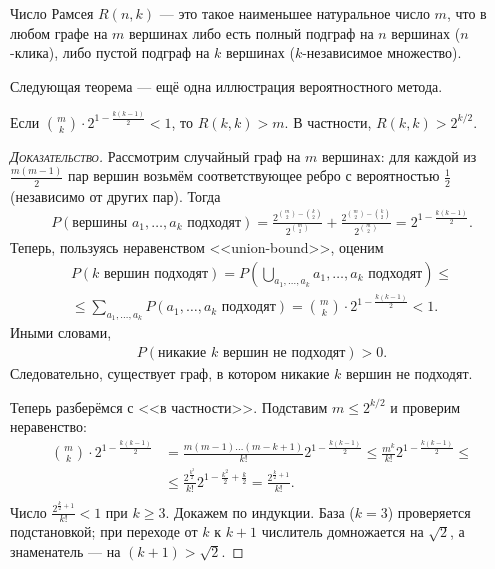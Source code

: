 \documentclass[../main.tex]{subfiles}
\begin{document}
\begin{exmpl*}
 Число Рамсея $R(n,k)$  --- это такое наименьшее натуральное число $m$, что в любом графе на $m$ вершинах либо есть полный подграф на $n$ вершинах ($n$-клика), либо пустой подграф на $k$ вершинах ($k$-независимое множество).
\end{exmpl*}
Следующая теорема --- ещё одна иллюстрация вероятностного метода.
\begin{thm}[Эрдёша]
 Если $\binom m k \cdot 2^{1 - \frac{k(k-1)}{2}} < 1$, то $R(k,k) > m$. В частности, $R(k,k) > 2^{k / 2}$.
\end{thm}
\begin{proof}[\normalfont\textsc{Доказательство}]
 Рассмотрим случайный граф на $m$  вершинах: для каждой из $\frac{m(m-1)}{2}$ пар вершин возьмём соответствующее ребро с вероятностью $\frac{1}{2}$ (независимо от других пар). Тогда
 \begin{align*}
  P(\text{вершины }a_1, \ldots, a_k\text{ подходят}) =  \frac{2^{\binom m 2 - \binom k 2}}{2^{\binom m 2}} + \frac{2^{\binom m 2 - \binom k 2}}{2^{\binom m 2}} =  2^{1-\frac{k(k-1)}{2}}.
 \end{align*} Теперь, пользуясь неравенством <<union-bound>>, оценим
 \begin{align*}
  P(k \text{ вершин подходят}) = P \left( \bigcup_{a_1, \ldots, a_k} a_1, \ldots, a_k \text{ подходят} \right) \leqslant \\
  \leqslant \sum_{a_1, \ldots, a_k}  P(a_1, \ldots, a_k \text{ подходят}) = \binom m k \cdot 2^{1 - \frac{k(k-1)}{2}} < 1.
 \end{align*} Иными словами,
 \begin{align*}
  P(\text{никакие $k$ вершин не подходят}) > 0.
 \end{align*} Следовательно, существует граф, в котором никакие  $k$  вершин не подходят.

 Теперь разберёмся с <<в частности>>. Подставим $m \leqslant 2^{k / 2}$ и проверим неравенство:
 \begin{align*}
  \binom m k \cdot 2^{1 - \frac{k(k-1)}{2}} &= \frac{m (m-1) \ldots (m - k + 1)}{k!}2^{1 - \frac{k(k-1)}{2}} \leqslant \frac{m^{k}}{k!} 2^{1-\frac{k(k-1)}{2}} \leqslant \\
  &\leqslant \frac{2^{\frac{k^{2}}{2}}}{k!}2^{1 - \frac{k^{2}}{2} + \frac{k}{2}} = \frac{2^{\frac{k}{2} + 1}}{k!}. \\
 \end{align*} Число $\frac{2^{\frac{k}{2} + 1}}{k!} < 1$ при $k \geqslant 3$. Докажем по индукции. База ($k = 3$) проверяется подстановкой; при переходе от $k$ к $k + 1$ числитель домножается  на $\sqrt 2$, а знаменатель --- на $(k + 1) > \sqrt 2$.
\end{proof}
\end{document}
